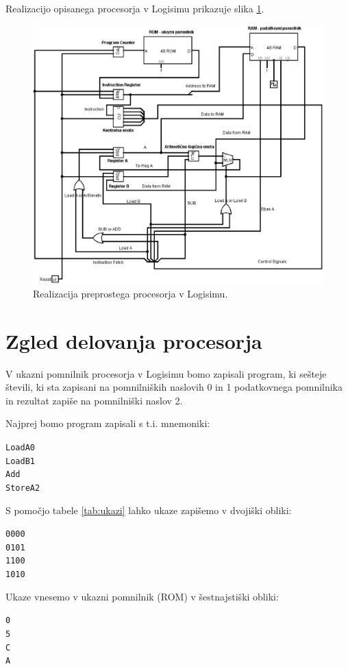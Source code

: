 Realizacijo opisanega procesorja v Logisimu prikazuje slika \ref{fig:procesor}.

\begin{figure}
\begin{center}
\includegraphics[width=0.75\columnwidth]{procesor/img/procesor}%
\caption{Realizacija preprostega procesorja v Logisimu.}%
\label{fig:procesor}%
\end{center}
\end{figure}


\section{Zgled delovanja procesorja}
\begin{zgled}
V ukazni pomnilnik procesorja v Logisimu bomo zapisali program, ki sešteje števili, ki sta zapisani na pomnilniških naslovih 0 in 1 podatkovnega pomnilnika in rezultat zapiše na pomnilniški naslov 2.

Najprej bomo program zapisali s t.i. mnemoniki:
\begin{alltt}
Load A 0
Load B 1
Add
Store A 2
\end{alltt}

S pomočjo tabele \ref{tab:ukazi} lahko ukaze zapišemo v dvojiški obliki:
\begin{alltt}
0000
0101
1100
1010
\end{alltt}

Ukaze vnesemo v ukazni pomnilnik (ROM) v šestnajstiški obliki:
\begin{alltt}
0
5
C
A
\end{alltt}

\end{zgled}

